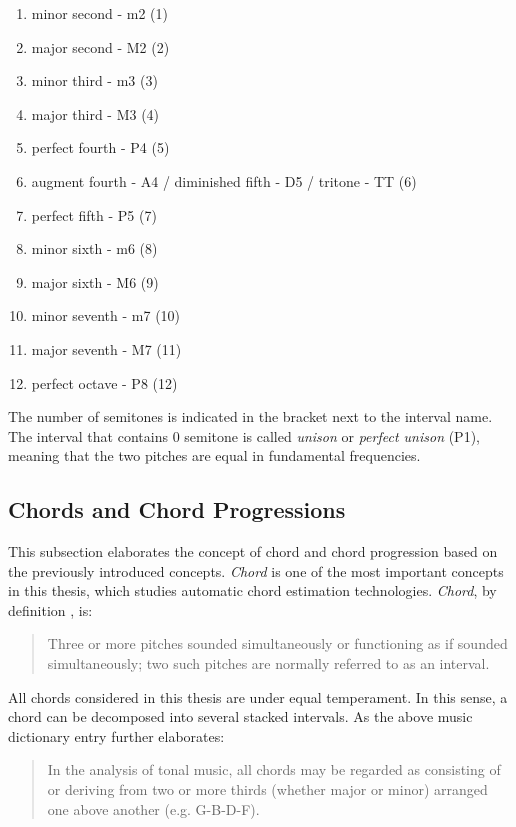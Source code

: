 \begin{enumerate}[label=(\alph*)]
\item minor second - m2 (1)
\item major second - M2 (2)
\item minor third - m3 (3)
\item major third - M3 (4)
\item perfect fourth - P4 (5)
\item augment fourth - A4 / diminished fifth - D5 / tritone - TT (6)
\item perfect fifth - P5 (7)
\item minor sixth - m6 (8)
\item major sixth - M6 (9)
\item minor seventh - m7 (10)
\item major seventh - M7 (11)
\item perfect octave - P8 (12)
\end{enumerate}
The number of semitones is indicated in the bracket next to the interval name. The interval that contains $0$ semitone is called {\it unison} or {\it perfect unison} (P1), meaning that the two pitches are equal in fundamental frequencies. %

\subsection{Chords and Chord Progressions}
This subsection elaborates the concept of chord and chord progression based on the previously introduced concepts.
{\it Chord} is one of the most important concepts in this thesis, which studies automatic chord estimation technologies. {\it Chord}, by definition \cite{randel1999harvard}, is:
\begin{quote}
Three or more pitches sounded simultaneously or functioning as if sounded simultaneously; two such pitches are normally referred to as an interval.
\end{quote}
All chords considered in this thesis are under equal temperament. In this sense, a chord can be decomposed into several stacked intervals. As the above music dictionary entry \cite{randel1999harvard} further elaborates:
\begin{quote}
In the analysis of tonal music, all chords may be regarded as consisting of or deriving from two or more thirds (whether major or minor) arranged one above another (e.g. G-B-D-F).
\end{quote}

